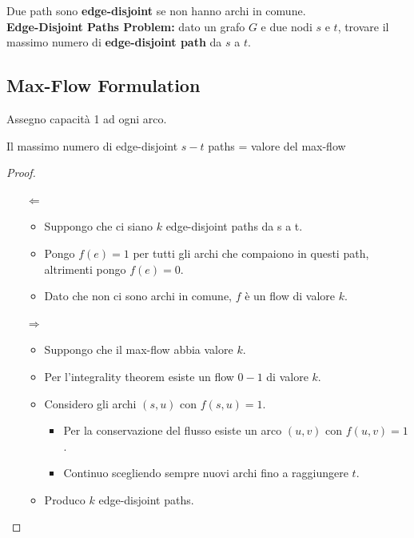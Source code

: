 Due path sono \textbf{edge-disjoint} se non hanno archi in comune.\\

\textbf{Edge-Disjoint Paths Problem:} dato un grafo $G$ e due nodi
$s$ e $t$, trovare il massimo numero di \textbf{edge-disjoint path}
da $s$ a $t$.

\subsection{Max-Flow Formulation}

Assegno capacità 1 ad ogni arco.

\begin{myblockquote}
	\begin{minipage}{\textwidth}
		\begin{theorem}
			Il massimo numero di edge-disjoint $s-t$ paths = valore del max-flow
		\end{theorem}
	\end{minipage}
\end{myblockquote}

\begin{proof}\
	\begin{itemize}
		\item[$\Leftarrow$]
			\begin{itemize}
				\item Suppongo che ci siano $k$ edge-disjoint paths da s a t.
				\item Pongo $f(e)=1$ per tutti gli archi che compaiono in questi
				      path, altrimenti pongo $f(e)=0$.
				\item Dato che non ci sono archi in comune, $f$ è un flow di
				      valore $k$.
			\end{itemize}
		\item[$\Rightarrow$]
			\begin{itemize}
				\item Suppongo che il max-flow abbia valore $k$.
				\item Per l'integrality theorem esiste un flow $0-1$ di valore $k$.
				\item Considero gli archi $(s, u)$ con $f(s, u) = 1$.
				      \begin{itemize}
					      \item Per la conservazione del flusso esiste un arco
					            $(u,v)$ con $f(u, v) = 1$.
					      \item Continuo scegliendo sempre nuovi archi fino a
					            raggiungere $t$.
				      \end{itemize}
				\item Produco $k$ edge-disjoint paths.
			\end{itemize}
	\end{itemize}
\end{proof}


